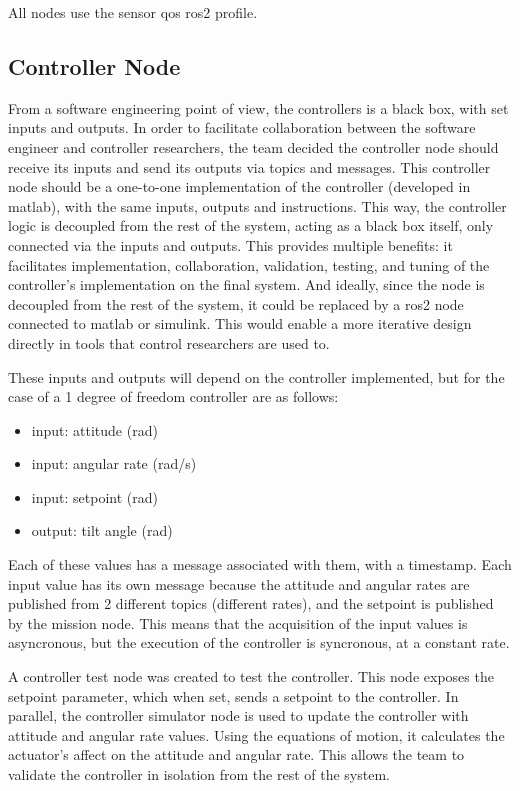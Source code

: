 \documentclass[a4paper]{article}
\begin{document}
All nodes use the sensor qos ros2 profile. 

\subsection{Controller Node}

From a software engineering point of view, the controllers is a black box, with set inputs and outputs. 
In order to facilitate collaboration between the software engineer and controller researchers, the team decided the controller node should receive its inputs and send its outputs via topics and messages. 
This controller node should be a one-to-one implementation of the controller (developed in matlab), with the same inputs, outputs and instructions. 
This way, the controller logic is decoupled from the rest of the system, acting as a black box itself, only connected via the inputs and outputs. 
This provides multiple benefits: it facilitates implementation, collaboration, validation, testing, and tuning of the controller's implementation on the final system. 
And ideally, since the node is decoupled from the rest of the system, it could be replaced by a ros2 node connected to matlab or simulink. 
This would enable a more iterative design directly in tools that control researchers are used to. 

These inputs and outputs will depend on the controller implemented, but for the case of a 1 degree of freedom controller are as follows: 

\begin{itemize}
    \item input: attitude (rad)
    \item input: angular rate (rad/s)
    \item input: setpoint (rad)
    \item output: tilt angle (rad)
\end{itemize}

Each of these values has a message associated with them, with a timestamp. 
Each input value has its own message because the attitude and angular rates are published from 2 different topics (different rates), and the setpoint is published by the mission node. 
This means that the acquisition of the input values is asyncronous, but the execution of the controller is syncronous, at a constant rate. 

A controller test node was created to test the controller. 
This node exposes the setpoint parameter, which when set, sends a setpoint to the controller. 
In parallel, the controller simulator node is used to update the controller with attitude and angular rate values. 
Using the equations of motion, it calculates the actuator's affect on the attitude and angular rate. 
This allows the team to validate the controller in isolation from the rest of the system. 
\end{document}
